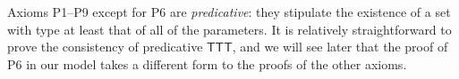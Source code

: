 \begin{remark}
    Axioms P1--P9 except for P6 are \emph{predicative}: they stipulate the existence of a set with type at least that of all of the parameters.
    It is relatively straightforward to prove the consistency of predicative \( \mathsf{TTT} \), and we will see later that the proof of P6 in our model takes a different form to the proofs of the other axioms.
\end{remark}
